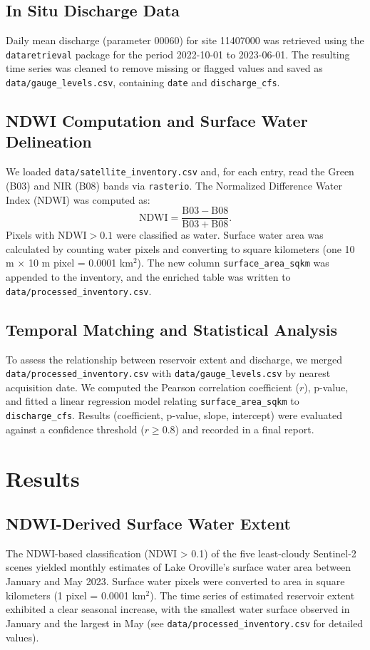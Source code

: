 \documentclass[preprint,12pt]{elsarticle}
\begin{document}
\subsection{In Situ Discharge Data}
Daily mean discharge (parameter 00060) for site 11407000 was retrieved using the \texttt{dataretrieval} package for the period 2022-10-01 to 2023-06-01. The resulting time series was cleaned to remove missing or flagged values and saved as \texttt{data/gauge\_levels.csv}, containing \texttt{date} and \texttt{discharge\_cfs}.

\subsection{NDWI Computation and Surface Water Delineation}
We loaded \texttt{data/satellite\_inventory.csv} and, for each entry, read the Green (B03) and NIR (B08) bands via \texttt{rasterio}. The Normalized Difference Water Index (NDWI) was computed as:
\[
  \mathrm{NDWI} = \frac{\mathrm{B03} - \mathrm{B08}}{\mathrm{B03} + \mathrm{B08}}.
\]
Pixels with $\mathrm{NDWI} > 0.1$ were classified as water. Surface water area was calculated by counting water pixels and converting to square kilometers (one 10 m $\times$ 10 m pixel = 0.0001 km$^2$). The new column \texttt{surface\_area\_sqkm} was appended to the inventory, and the enriched table was written to \texttt{data/processed\_inventory.csv}.

\subsection{Temporal Matching and Statistical Analysis}
To assess the relationship between reservoir extent and discharge, we merged \texttt{data/processed\_inventory.csv} with \texttt{data/gauge\_levels.csv} by nearest acquisition date. We computed the Pearson correlation coefficient ($r$), p-value, and fitted a linear regression model relating \texttt{surface\_area\_sqkm} to \texttt{discharge\_cfs}. Results (coefficient, p-value, slope, intercept) were evaluated against a confidence threshold ($r \ge 0.8$) and recorded in a final report.

\section{Results}

\subsection{NDWI-Derived Surface Water Extent}
The NDWI-based classification (NDWI > 0.1) of the five least-cloudy Sentinel-2 scenes yielded monthly estimates of Lake Oroville's surface water area between January and May 2023. Surface water pixels were converted to area in square kilometers (1 pixel = 0.0001 km$^2$). The time series of estimated reservoir extent exhibited a clear seasonal increase, with the smallest water surface observed in January and the largest in May (see \texttt{data/processed\_inventory.csv} for detailed values).
\end{document}
